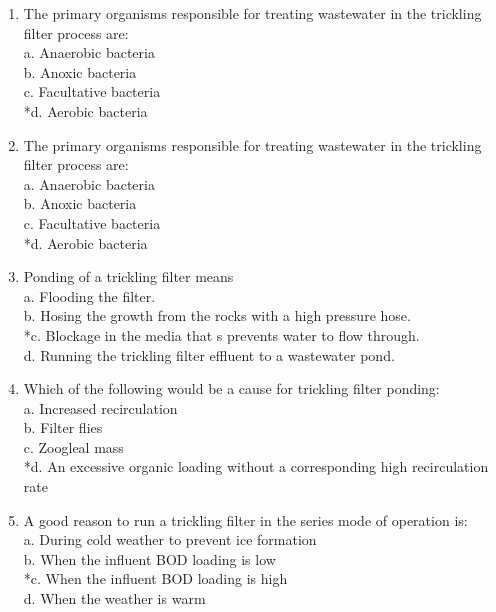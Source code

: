 \begin{enumerate}
\item  The primary organisms responsible for treating wastewater in the trickling filter process are: \\

 a. Anaerobic bacteria \\
 b. Anoxic bacteria \\
 c. Facultative bacteria \\
 *d. Aerobic bacteria \\


\item  The primary organisms responsible for treating wastewater in the trickling filter process are: \\

 a. Anaerobic bacteria \\
 b. Anoxic bacteria \\
 c. Facultative bacteria \\
 *d. Aerobic bacteria \\


\item  Ponding of a trickling filter means \\

 a. Flooding the filter. \\
 b. Hosing the growth from the rocks with a high pressure hose. \\
 *c. Blockage in the media that s prevents water to flow through. \\
 d. Running the trickling filter effluent to a wastewater pond. \\


\item  Which of the following would be a cause for trickling filter ponding: \\

 a. Increased recirculation \\
 b. Filter flies \\
 c. Zoogleal mass \\
 *d. An excessive organic loading without a corresponding high recirculation rate \\


\item  A good reason to run a trickling filter in the series mode of operation is: \\

 a. During cold weather to prevent ice formation \\
 b. When the influent BOD loading is low \\
 *c. When the influent BOD loading is high \\
 d. When the weather is warm \\



\end{enumerate}
